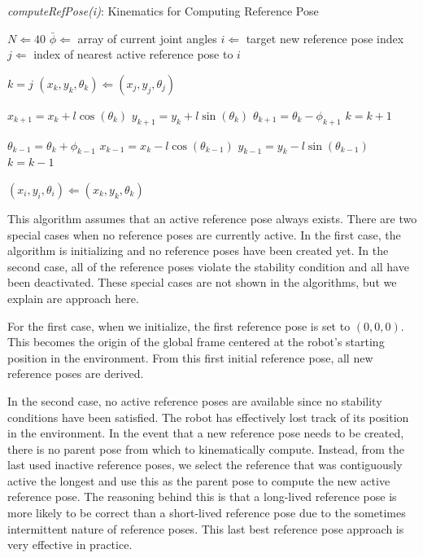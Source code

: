 \begin{algorithm}
\caption{\emph{computeRefPose(i)}: Kinematics for Computing Reference Pose}
\label{alg:kinematic}
\begin{algorithmic}

\State $N \Leftarrow 40$
\State $\bar{\phi} \Leftarrow $ array of current joint angles 
\State $i \Leftarrow $ target new reference pose index
\State $j \Leftarrow $ index of nearest active reference pose to $i$

\State $k = j$
\State $(x_k, y_k, \theta_k) \Leftarrow (x_j, y_j, \theta_j)$  


\State $x_{k+1} = x_k + l \cos(\theta_k)$
\State $y_{k+1} = y_k + l \sin(\theta_k)$
\State $\theta_{k+1} = \theta_k - \phi_{k+1}$
\State $k = k + 1$
\EndWhile


\State $\theta_{k-1} = \theta_k + \phi_{k-1}$
\State $x_{k-1} = x_k - l \cos(\theta_{k-1})$
\State $y_{k-1} = y_k - l \sin(\theta_{k-1})$
\State $k = k - 1$

\EndWhile
\EndIf

\State $(x_i, y_i, \theta_i) \Leftarrow (x_k, y_k, \theta_k)$ 

\end{algorithmic}
\end{algorithm}


This algorithm assumes that an active reference pose always exists. There are two special cases when no reference poses are currently active. In the first case, the algorithm is initializing and no reference poses have been created yet. In the second case, all of the reference poses violate the stability condition and all have been deactivated. These special cases are not shown in the algorithms, but we explain are approach here.

For the first case, when we initialize, the first reference pose is set to $(0,0,0)$. This becomes the origin of the global frame centered at the robot's starting position in the environment. From this first initial reference pose, all new reference poses are derived. 

In the second case, no active reference poses are available since no stability conditions have been satisfied. The robot has effectively lost track of its position in the environment. In the event that a new reference pose needs to be created, there is no parent pose from which to kinematically compute. Instead, from the last used inactive reference poses, we select the reference that was contiguously active the longest and use this as the parent pose to compute the new active reference pose. The reasoning behind this is that a long-lived reference pose is more likely to be correct than a short-lived reference pose due to the sometimes intermittent nature of reference poses. This last best reference pose approach is very effective in practice. 

